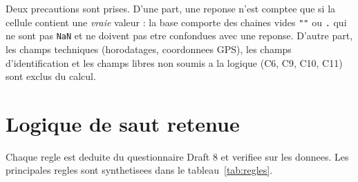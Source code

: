 \documentclass[11pt,a4paper]{article}
\begin{document}
Deux precautions sont prises. D'une part, une reponse n'est comptee que si
la cellule contient une \emph{vraie} valeur : la base comporte des chaines
vides \texttt{""} ou \texttt{.} qui ne sont pas \texttt{NaN} et ne doivent
pas etre confondues avec une reponse. D'autre part, les champs techniques
(horodatages, coordonnees GPS), les champs d'identification et les champs
libres non soumis a la logique (C6, C9, C10, C11) sont exclus du calcul.

\section{Logique de saut retenue}

Chaque regle est deduite du questionnaire Draft 8 et verifiee sur les
donnees. Les principales regles sont synthetisees dans le
tableau~\ref{tab:regles}.
\end{document}
